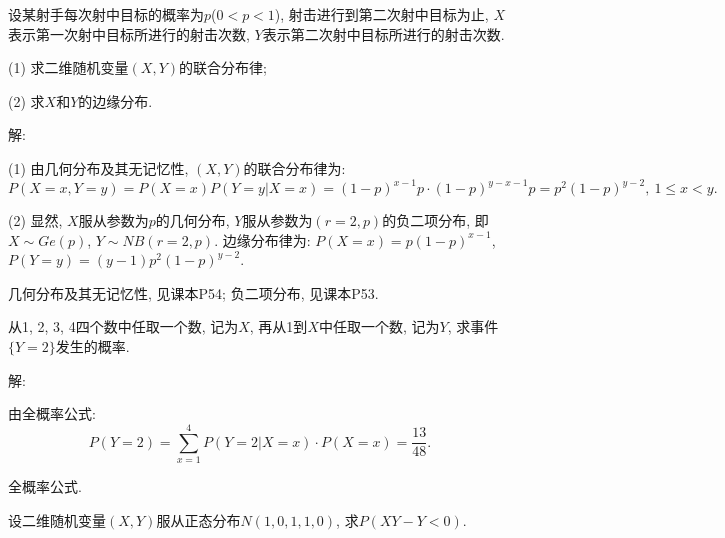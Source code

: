 \documentclass[standard]{ExBook}
\begin{document}
\begin{qitems}
\vspace{-5em}

    \begin{bbox}
    \begin{shaded}
        \qitem
设某射手每次射中目标的概率为$p$($0 < p < 1$), 射击进行到第二次射中目标为止, $X$表示第一次射中目标所进行的射击次数, $Y$表示第二次射中目标所进行的射击次数.

(1) 求二维随机变量$(X,Y)$的联合分布律;

(2) 求$X$和$Y$的边缘分布.
    \end{shaded}
    \end{bbox}

\vspace{-5em}

    \begin{bbox}
解: 

(1) 由几何分布及其无记忆性, $(X,Y)$的联合分布律为:
$$P(X=x,Y=y)=P(X=x)P(Y=y|X=x)=(1-p)^{x-1}p\cdot(1-p)^{y-x-1}p=p^2(1-p)^{y-2},\ 1\leq x<y.$$

(2) 显然, $X$服从参数为$p$的几何分布, $Y$服从参数为$(r=2, p)$的负二项分布, 即$X\sim Ge(p)$, $Y\sim NB(r=2,p)$. 边缘分布律为: $P(X=x)=p(1-p)^{x-1}$, $P(Y=y)=(y-1)p^2(1-p)^{y-2}$.

\textcolor{themeColor}{\selectfont {} 几何分布及其无记忆性, 见课本P54; 负二项分布, 见课本P53.}
    \end{bbox}

\vspace{-5em}

    \begin{bbox}
    \begin{shaded}
        \qitem
从1, 2, 3, 4四个数中任取一个数, 记为$X$, 再从1到$X$中任取一个数, 记为$Y$, 求事件$\{Y=2\}$发生的概率.
    \end{shaded}
    \end{bbox}

\vspace{-5em}

    \begin{bbox}
解: 

由全概率公式:
$$P(Y=2)=\sum\limits_{x=1}^{4}P(Y=2|X=x)\cdot P(X=x)=\frac{13}{48}.$$

\textcolor{themeColor}{\selectfont {} 全概率公式.}
    \end{bbox}

\vspace{-5em}

    \begin{bbox}
    \begin{shaded}
        \qitem
设二维随机变量$(X,Y)$服从正态分布$N(1,0,1,1,0)$, 求$P(XY-Y<0)$.
    \end{shaded}
    \end{bbox}


\end{qitems}
\end{document}
